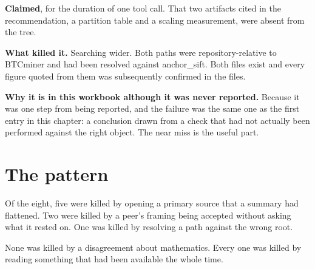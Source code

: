 \textbf{Claimed}, for the duration of one tool call. That two artifacts cited in the recommendation,
a partition table and a scaling measurement, were absent from the tree.

\textbf{What killed it.} Searching wider. Both paths were repository-relative to BTCminer and had
been resolved against anchor\_sift. Both files exist and every figure quoted from them was
subsequently confirmed in the files.

\textbf{Why it is in this workbook although it was never reported.} Because it was one step from
being reported, and the failure was the same one as the first entry in this chapter: a conclusion
drawn from a check that had not actually been performed against the right object. The near miss is
the useful part.

\section{The pattern}

Of the eight, five were killed by opening a primary source that a summary had flattened. Two were
killed by a peer's framing being accepted without asking what it rested on. One was killed by
resolving a path against the wrong root.

None was killed by a disagreement about mathematics. Every one was killed by reading something that
had been available the whole time.
